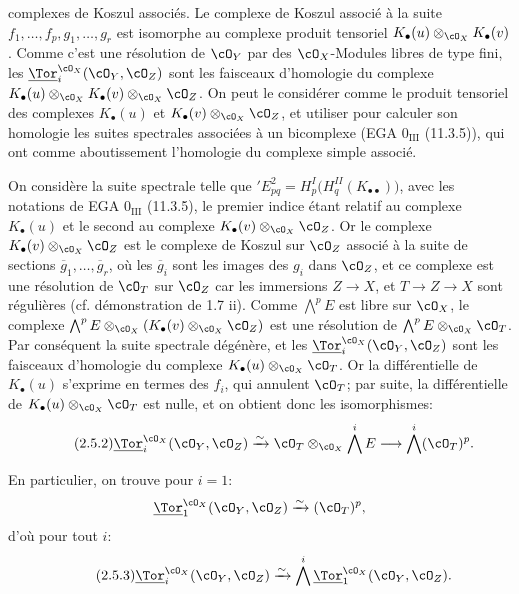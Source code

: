 complexes de Koszul associés. Le complexe de Koszul associé à la suite \(f_1,\ldots,f_p,g_1,\ldots,g_r\) est isomorphe au complexe produit tensoriel \(K_\bullet(u)\otimes_{\cO_X}K_\bullet(v)\). Comme c'est une résolution de \(\cO_Y\) par des \(\cO_X\)-Modules libres de type fini, les \(\underline{\Tor}_i^{\cO_X}(\cO_Y,\cO_Z)\) sont les faisceaux d'homologie du complexe \(K_\bullet(u)\otimes_{\cO_X}K_\bullet(v)\otimes_{\cO_X}\cO_Z\). On peut le considérer comme le produit tensoriel des complexes \(K_\bullet(u)\) et \(K_\bullet(v)\otimes_{\cO_X}\cO_Z\), et utiliser pour calculer son homologie les suites spectrales associées à un bicomplexe (EGA \(0_{\mathrm{III}}\) (11.3.5)), qui ont comme aboutissement l'homologie du complexe simple associé.

On considère la suite spectrale telle que \({}'E^2_{pq}=H^I_p\bigl(H^{II}_q(K_{\bullet\bullet})\bigr)\), avec les notations de EGA \(0_{\mathrm{III}}\) (11.3.5), le premier indice étant relatif au complexe \(K_\bullet(u)\) et le second au complexe \(K_\bullet(v)\otimes_{\cO_X}\cO_Z\). Or le complexe \(K_\bullet(v)\otimes_{\cO_X}\cO_Z\) est le complexe de Koszul sur \(\cO_Z\) associé à la suite de sections \(\overline g_1,\ldots,\overline g_r\), où les \(\overline g_i\) sont les images des \(g_i\) dans \(\cO_Z\), et ce complexe est une résolution de \(\cO_T\) sur \(\cO_Z\) car les immersions \(Z\to X\), et \(T\to Z\to X\) sont régulières (cf. démonstration de 1.7 ii). Comme \(\bigwedge^p E\) est libre sur \(\cO_X\), le complexe \(\bigwedge^pE\otimes_{\cO_X}(K_\bullet(v)\otimes_{\cO_X}\cO_Z)\) est une résolution de \(\bigwedge^pE\otimes_{\cO_X}\cO_T\). Par conséquent la suite spectrale dégénère, et les \(\underline{\Tor}_i^{\cO_X}(\cO_Y,\cO_Z)\) sont les faisceaux d'homologie du complexe \(K_\bullet(u)\otimes_{\cO_X}\cO_T\). Or la différentielle de \(K_\bullet(u)\) s'exprime en termes des \(f_i\), qui annulent \(\cO_T\); par suite, la différentielle de \(K_\bullet(u)\otimes_{\cO_X}\cO_T\) est nulle, et on obtient donc les isomorphismes:
\begin{equation}\tag{2.5.2}
\underline{\Tor}_i^{\cO_X}(\cO_Y,\cO_Z)
\xrightarrow{\sim}
\cO_T\otimes_{\cO_X}\bigwedge^iE
\longrightarrow
\bigwedge^i(\cO_T)^p.
\end{equation}

En particulier, on trouve pour \(i=1\):
\[
\underline{\Tor}_1^{\cO_X}(\cO_Y,\cO_Z)\xrightarrow{\sim}(\cO_T)^p,
\]
d'où pour tout \(i\):
\begin{equation}\tag{2.5.3}
\underline{\Tor}_i^{\cO_X}(\cO_Y,\cO_Z)
\xrightarrow{\sim}
\bigwedge^i\underline{\Tor}_1^{\cO_X}(\cO_Y,\cO_Z).
\end{equation}

